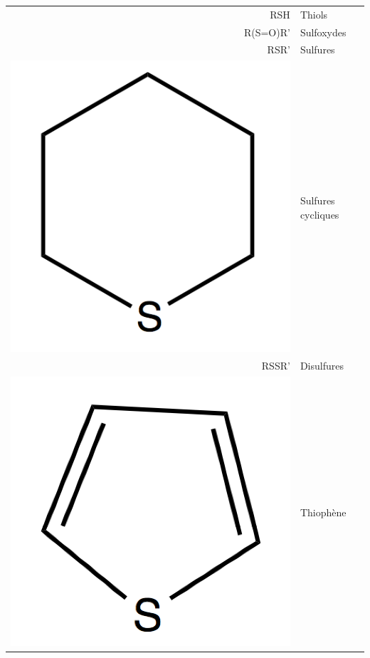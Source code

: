 \begin{table}[h!]
	\begin{center}
		\begin{tabular}{rl}
			\hline
			RSH & Thiols \\
			R(S=O)R' & Sulfoxydes \\
			RSR' & Sulfures \\
			\includegraphics[scale=0.08]{image/sulfure-cycle} & Sulfures cycliques \\
			RSSR' & Disulfures \\
			 \includegraphics[scale=0.08]{image/thiophene} & Thiophène \\

\end{tabular}
\end{center}
\end{table}
